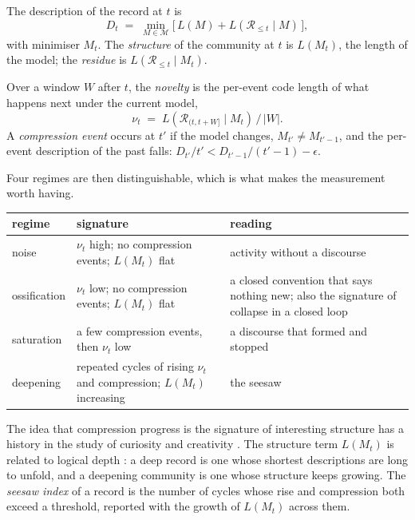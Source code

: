 \documentclass[11pt,a4paper]{article}
\newcommand{\Rec}{\mathcal{R}}
\newcommand{\Mod}{\mathcal{M}}
\newcommand{\Lc}{L}
\begin{document}
\begin{definition}
The description of the record at $t$ is
\[
D_t \;=\; \min_{M\in\Mod}\bigl[\,\Lc(M) + \Lc(\Rec_{\le t}\mid M)\,\bigr],
\]
with minimiser $M_t$. The \emph{structure} of the community at $t$ is $\Lc(M_t)$, the length of
the model; the \emph{residue} is $\Lc(\Rec_{\le t}\mid M_t)$.
\end{definition}

\begin{definition}
Over a window $W$ after $t$, the \emph{novelty} is the per-event code length of what happens next
under the current model,
\[
\nu_t \;=\; \Lc(\Rec_{(t,t+W]}\mid M_t)\,/\,|W|.
\]
A \emph{compression event} occurs at $t'$ if the model changes, $M_{t'}\ne M_{t'-1}$, and the
per-event description of the past falls: $D_{t'}/t' < D_{t'-1}/(t'-1)-\epsilon$.
\end{definition}

Four regimes are then distinguishable, which is what makes the measurement worth having.

\begin{center}\small
\begin{tabularx}{\linewidth}{@{}l>{\raggedright\arraybackslash}p{44mm}X@{}}
\toprule
regime & signature & reading \\
\midrule
noise & $\nu_t$ high; no compression events; $\Lc(M_t)$ flat & activity without a discourse \\
ossification & $\nu_t$ low; no compression events; $\Lc(M_t)$ flat & a closed convention that says
  nothing new; also the signature of collapse in a closed loop \\
saturation & a few compression events, then $\nu_t$ low & a discourse that formed and stopped \\
deepening & repeated cycles of rising $\nu_t$ and compression; $\Lc(M_t)$ increasing & the seesaw \\
\bottomrule
\end{tabularx}
\end{center}

The idea that compression progress is the signature of interesting structure has a history in the
study of curiosity and creativity \cite{schmidhuber}. The structure term $\Lc(M_t)$ is related to
logical depth \cite{bennett}: a deep record is one whose shortest descriptions are long to unfold,
and a deepening community is one whose structure keeps growing. The \emph{seesaw index} of a record
is the number of cycles whose rise and compression both exceed a threshold, reported with the
growth of $\Lc(M_t)$ across them.
\end{document}
